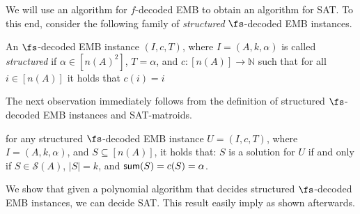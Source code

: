 	

	
	
	
	We will use an algorithm for $f$-decoded EMB to obtain an algorithm for SAT. To this end, consider the following family of {\em structured } $\fs$-decoded EMB instances.
		
		
											\begin{definition}
			\label{def:problemE}
			An $\fs$-{\sc decoded EMB} instance $(I,c,T)$, where $I = (A,k,\alpha)$ is called {\em structured} if  $\alpha \in \left[ {n(A)}^2 \right]$, $T = \alpha$, and $c: \left[ n(A) \right] \rightarrow \mathbb{N}$ such that for all $i \in \left[ n(A) \right]$ it holds that $c(i) = i$ %
		\end{definition}
		
		
		The next observation immediately follows from the definition of structured $\fs$-decoded EMB instances and SAT-matroids. 
		
		\begin{observation}
			\label{obs:YesNoD}
			for any structured $\fs$-{\sc decoded EMB} instance $U = (I,c,T)$, where $I = (A,k,\alpha)$, and $S \subseteq \left[ n(A)\right]$, it holds that: $S$ is a solution for $U$ if and only if $S \in \mathcal{S}(A)$, $|S| = k$, and $\textnormal{\textsf{sum}}(S) = c(S) = \alpha$. 
		\end{observation}
		
		We show that given a polynomial algorithm that decides structured $\fs$-decoded EMB instances, we can decide SAT. This result easily imply  as shown afterwards.  
		

